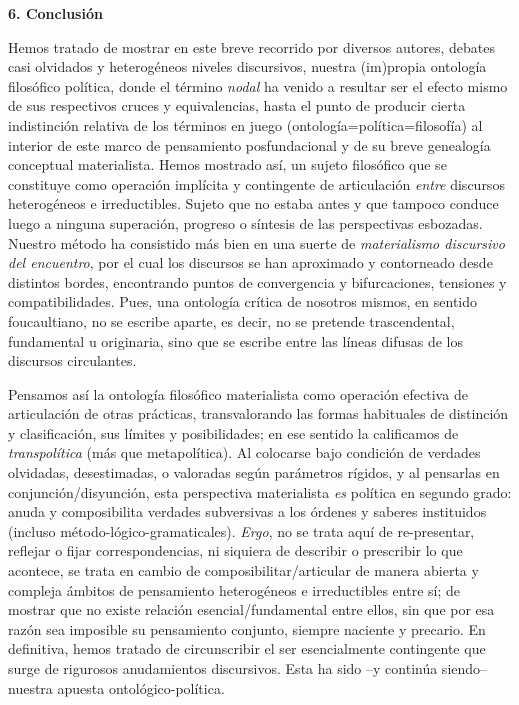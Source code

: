\textbf{6. Conclusión}

Hemos tratado de mostrar en este breve recorrido por diversos autores, debates casi olvidados y heterogéneos niveles discursivos, nuestra (im)propia ontología filosófico política, donde el término \emph{nodal} ha venido a resultar ser el efecto mismo de sus respectivos cruces y equivalencias, hasta el punto de producir cierta indistinción relativa de los términos en juego (ontología=política=filosofía) al interior de este marco de pensamiento posfundacional y de su breve genealogía conceptual materialista. Hemos mostrado así, un sujeto filosófico que se constituye como operación implícita y contingente de articulación \emph{entre} discursos heterogéneos e irreductibles. Sujeto que no estaba antes y que tampoco conduce luego a ninguna superación, progreso o síntesis de las perspectivas esbozadas. Nuestro método ha consistido más bien en una suerte de \emph{materialismo discursivo del encuentro}, por el cual los discursos se han aproximado y contorneado desde distintos bordes, encontrando puntos de convergencia y bifurcaciones, tensiones y compatibilidades. Pues, una ontología crítica de nosotros mismos, en sentido foucaultiano, no se escribe aparte, es decir, no se pretende trascendental, fundamental u originaria, sino que se escribe entre las líneas difusas de los discursos circulantes.

Pensamos así la ontología filosófico materialista como operación efectiva de articulación de otras prácticas, transvalorando las formas habituales de distinción y clasificación, sus límites y posibilidades; en ese sentido la calificamos de \emph{transpolítica} (más que metapolítica). Al colocarse bajo condición de verdades olvidadas, desestimadas, o valoradas según parámetros rígidos, y al pensarlas en conjunción/disyunción, esta perspectiva materialista \emph{es} política en segundo grado: anuda y composibilita verdades subversivas a los órdenes y saberes instituidos (incluso método-lógico-gramaticales). \emph{Ergo}, no se trata aquí de re-presentar, reflejar o fijar correspondencias, ni siquiera de describir o prescribir lo que acontece, se trata en cambio de composibilitar/articular de manera abierta y compleja ámbitos de pensamiento heterogéneos e irreductibles entre sí; de mostrar que no existe relación esencial/fundamental entre ellos, sin que por esa razón sea imposible su pensamiento conjunto, siempre naciente y precario. En definitiva, hemos tratado de circunscribir el ser esencialmente contingente que surge de rigurosos anudamientos discursivos. Esta ha sido --y continúa siendo-- nuestra apuesta ontológico-política.

